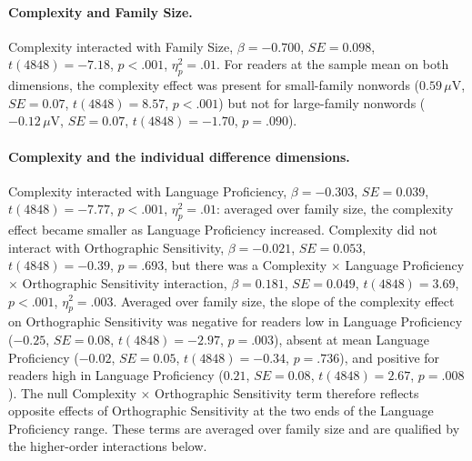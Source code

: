 \paragraph*{Complexity and Family Size.} Complexity interacted with Family Size, $\beta = -0.700$, $SE = 0.098$, $t(4848) = -7.18$, $p < .001$, $\eta^2_p = .01$. For readers at the sample mean on both dimensions, the complexity effect was present for small-family nonwords ($0.59\,\mu$V, $SE = 0.07$, $t(4848) = 8.57$, $p < .001$) but not for large-family nonwords ($-0.12\,\mu$V, $SE = 0.07$, $t(4848) = -1.70$, $p = .090$).

\paragraph*{Complexity and the individual difference dimensions.} Complexity interacted with Language Proficiency, $\beta = -0.303$, $SE = 0.039$, $t(4848) = -7.77$, $p < .001$, $\eta^2_p = .01$: averaged over family size, the complexity effect became smaller as Language Proficiency increased. Complexity did not interact with Orthographic Sensitivity, $\beta = -0.021$, $SE = 0.053$, $t(4848) = -0.39$, $p = .693$, but there was a Complexity $\times$ Language Proficiency $\times$ Orthographic Sensitivity interaction, $\beta = 0.181$, $SE = 0.049$, $t(4848) = 3.69$, $p < .001$, $\eta^2_p = .003$. Averaged over family size, the slope of the complexity effect on Orthographic Sensitivity was negative for readers low in Language Proficiency ($-0.25$, $SE = 0.08$, $t(4848) = -2.97$, $p = .003$), absent at mean Language Proficiency ($-0.02$, $SE = 0.05$, $t(4848) = -0.34$, $p = .736$), and positive for readers high in Language Proficiency ($0.21$, $SE = 0.08$, $t(4848) = 2.67$, $p = .008$). The null Complexity $\times$ Orthographic Sensitivity term therefore reflects opposite effects of Orthographic Sensitivity at the two ends of the Language Proficiency range. These terms are averaged over family size and are qualified by the higher-order interactions below.

